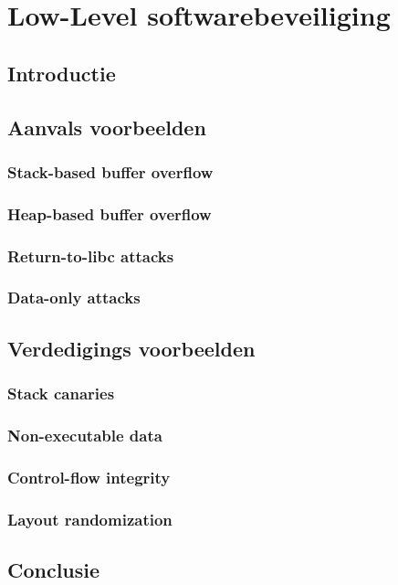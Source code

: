 \documentclass[../main.tex]{subfiles}
\begin{document}
\chapter{Low-Level softwarebeveiliging}
\section{Introductie}
\section{Aanvals voorbeelden}
\subsection{Stack-based buffer overflow}
\subsection{Heap-based buffer overflow}
\subsection{Return-to-libc attacks}
\subsection{Data-only attacks}
\section{Verdedigings voorbeelden}
\subsection{Stack canaries}
\subsection{Non-executable data}
\subsection{Control-flow integrity}
\subsection{Layout randomization}
\section{Conclusie}
\end{document}
